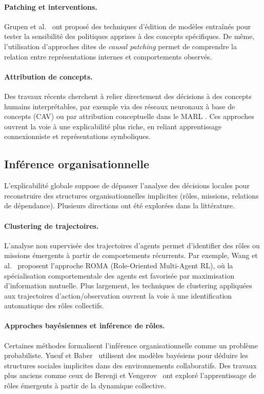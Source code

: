 \paragraph{Patching et interventions.}
Grupen et al.~\cite{grupen2022concept} ont proposé des techniques
d’édition de modèles entraînés pour tester la sensibilité
des politiques apprises à des concepts spécifiques.
De même, l’utilisation d’approches dites de \textit{causal patching}
\cite{geiger2021causal} permet de comprendre la relation entre
représentations internes et comportements observés.

\paragraph{Attribution de concepts.}
Des travaux récents cherchent à relier directement des décisions
à des concepts humains interprétables,
par exemple via des réseaux neuronaux à base de concepts (CAV)
\cite{kim2018interpretability}
ou par attribution conceptuelle dans le MARL
\cite{zabounidis2023concept}.
Ces approches ouvrent la voie à une explicabilité plus riche,
en reliant apprentissage connexionniste et représentations symboliques.

\subsection{Inférence organisationnelle}

\noindent
L’explicabilité globale suppose de dépasser l’analyse des décisions locales
pour reconstruire des structures organisationnelles implicites
(rôles, missions, relations de dépendance).
Plusieurs directions ont été explorées dans la littérature.

\paragraph{Clustering de trajectoires.}
L’analyse non supervisée des trajectoires d’agents permet d’identifier
des rôles ou missions émergents à partir de comportements récurrents.
Par exemple, Wang et al.~\cite{Wang2020} proposent l’approche ROMA
(Role-Oriented Multi-Agent RL), où la spécialisation comportementale
des agents est favorisée par maximisation d’information mutuelle.
Plus largement, les techniques de clustering appliquées aux trajectoires
d’action/observation ouvrent la voie à une identification
automatique des rôles collectifs.

\paragraph{Approches bayésiennes et inférence de rôles.}
Certaines méthodes formalisent l’inférence organisationnelle
comme un problème probabiliste.
Yusuf et Baber~\cite{yusuf2020inferential} utilisent des modèles bayésiens
pour déduire les structures sociales implicites dans des environnements collaboratifs.
Des travaux plus anciens comme ceux de Berenji et Vengerov~\cite{berenji2000learning}
ont exploré l’apprentissage de rôles émergents à partir de la dynamique collective.


